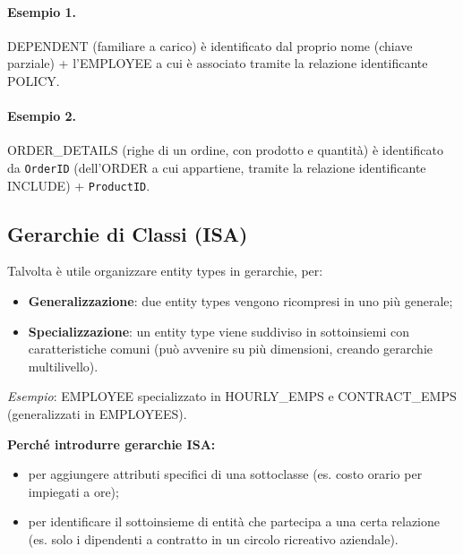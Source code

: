 \documentclass[12pt, a4paper]{article}
\begin{document}
\paragraph{Esempio 1.} DEPENDENT (familiare a carico) è identificato dal proprio nome (chiave parziale) + l'EMPLOYEE a cui è associato tramite la relazione identificante POLICY.

\paragraph{Esempio 2.} ORDER\_DETAILS (righe di un ordine, con prodotto e quantità) è identificato da \texttt{OrderID} (dell'ORDER a cui appartiene, tramite la relazione identificante INCLUDE) + \texttt{ProductID}.

\subsection{Gerarchie di Classi (ISA)}

Talvolta è utile organizzare entity types in gerarchie, per:
\begin{itemize}
    \item \textbf{Generalizzazione}: due entity types vengono ricompresi in uno più generale;
    \item \textbf{Specializzazione}: un entity type viene suddiviso in sottoinsiemi con caratteristiche comuni (può avvenire su più dimensioni, creando gerarchie multilivello).
\end{itemize}
\textit{Esempio}: EMPLOYEE specializzato in HOURLY\_EMPS e CONTRACT\_EMPS (generalizzati in EMPLOYEES).

\textbf{Perché introdurre gerarchie ISA:}
\begin{itemize}
    \item per aggiungere attributi specifici di una sottoclasse (es. costo orario per impiegati a ore);
    \item per identificare il sottoinsieme di entità che partecipa a una certa relazione (es. solo i dipendenti a contratto in un circolo ricreativo aziendale).
\end{itemize}
\end{document}
